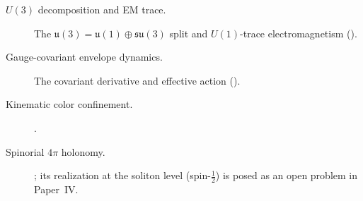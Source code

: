 \begin{description}
  \item[\normalfont $U(3)$ decomposition and EM trace.]
  The $\mathfrak{u}(3)=\mathfrak{u}(1)\oplus\mathfrak{su}(3)$ split and $U(1)$-trace
  electromagnetism ().
  \item[\normalfont Gauge-covariant envelope dynamics.]
  The covariant derivative and effective action ().
  \item[\normalfont Kinematic color confinement.]
  .
  \item[\normalfont Spinorial $4\pi$ holonomy.]
  ; its realization at the soliton level (spin-$\tfrac12$) is
  posed as an open problem in Paper~IV.
\end{description}